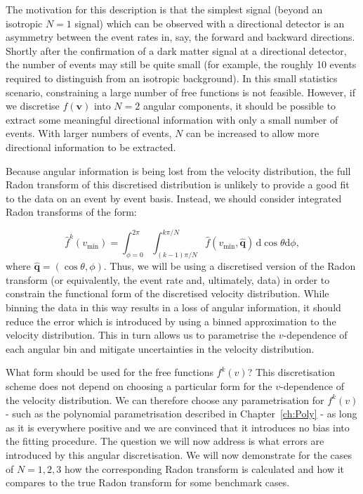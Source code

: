 The motivation for this description is that the simplest signal (beyond an isotropic $N=1$ signal) which can be observed with a directional detector is an asymmetry between the event rates in, say, the forward and backward directions. Shortly after the confirmation of a dark matter signal at a directional detector, the number of events may still be quite small (for example, the roughly 10 events required to distinguish from an isotropic background). In this small statistics scenario, constraining a large number of free functions is not feasible. However, if we discretise $f(\textbf{v})$ into $N=2$ angular components, it should be possible to extract some meaningful directional information with only a small number of events. With larger numbers of events, $N$ can be increased to allow more directional information to be extracted.

Because angular information is being lost from the velocity distribution, the full Radon transform of this discretised distribution is unlikely to provide a good fit to the data on an event by event basis. Instead, we should consider integrated Radon transforms of the form:

\begin{equation}
\hat{f}^k(v_\textrm{min}) = \int_{\phi = 0}^{2\pi} \int_{(k-1)\pi/N}^{k\pi/N} \hat{f}(v_\textrm{min}, \hat{\textbf{q}})\, \mathrm{d}\cos\theta\mathrm{d}\phi,
\end{equation}
 where $\hat{\textbf{q}} = (\cos\theta, \phi)$. Thus, we will be using a discretised version of the Radon transform (or equivalently, the event rate and, ultimately, data) in order to constrain the functional form of the discretised velocity distribution. While binning the data in this way results in a loss of angular information, it should reduce the error which is introduced by using a binned approximation to the velocity distribution. This in turn allows us to parametrise the $v$-dependence of each angular bin and mitigate uncertainties in the velocity distribution.

What form should be used for the free functions $f^k(v)$? This discretisation scheme does not depend on choosing a particular form for the $v$-dependence of the velocity distribution. We can therefore choose any parametrisation for $f^k(v)$ - such as the polynomial parametrisation described in Chapter~\ref{ch:Poly} - as long as it is everywhere positive and we are convinced that it introduces no bias into the fitting procedure. The question we will now address is what errors are introduced by this angular discretisation. We will now demonstrate for the cases of $N=1, 2, 3$ how the corresponding Radon transform is calculated and how it compares to the true Radon transform for some benchmark cases.


